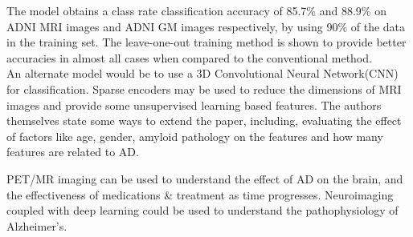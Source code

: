 \documentclass[11pt]{article}
\begin{document}
  The model obtains a class rate classification accuracy of 85.7\%  and 88.9\% on ADNI MRI images and ADNI GM images respectively, by using 90\% of the data in the training set.
  The leave-one-out training method is shown to provide better accuracies in almost all cases when compared to the conventional method.\\

  An alternate model would be to use a 3D Convolutional Neural Network(CNN) for classification. Sparse encoders may be used to reduce the dimensions of MRI images and provide some unsupervised learning based features. The authors themselves state some ways to extend the paper, including, evaluating the effect of factors like age, gender, amyloid pathology on the features and how many features are related to AD.

  PET/MR imaging can be used to understand the effect of AD on the brain, and the effectiveness of medications \& treatment as time progresses. Neuroimaging coupled with deep learning could be used to understand the pathophysiology of Alzheimer's.
\end{document}
